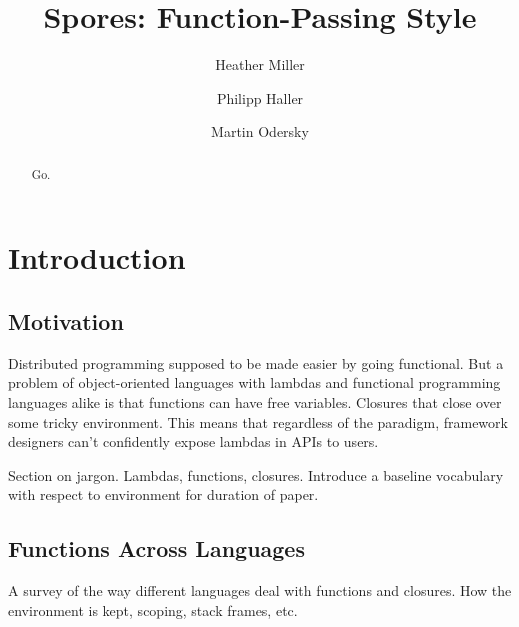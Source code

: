 \documentclass{llncs}
\begin{document}
%
\mainmatter              %
%
\title{Spores: Function-Passing Style}
%
%
\author{Heather Miller \and Philipp Haller
\and Martin Odersky}
%
%
%

\maketitle              %

\begin{abstract}
Go.
\end{abstract}
%
\section{Introduction}


\subsection{Motivation}

Distributed programming supposed to be made easier by going functional. But a problem of object-oriented languages with lambdas and functional programming languages alike is that functions can have free variables. Closures that close over some tricky environment. This means that regardless of the paradigm, framework designers can't confidently expose lambdas in APIs to users.

Section on jargon. Lambdas, functions, closures. Introduce a baseline
vocabulary with respect to environment for duration of paper.

\subsection{Functions Across Languages}

A survey of the way different languages deal with functions and closures. How
the environment is kept, scoping, stack frames, etc.
\end{document}
